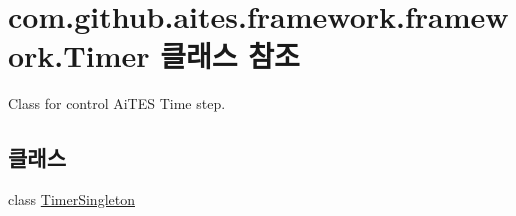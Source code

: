 \hypertarget{classcom_1_1github_1_1aites_1_1framework_1_1framework_1_1_timer}{}\section{com.\+github.\+aites.\+framework.\+framework.\+Timer 클래스 참조}
\label{classcom_1_1github_1_1aites_1_1framework_1_1framework_1_1_timer}


Class for control Ai\+T\+ES Time step.  


\subsection*{클래스}
\begin{DoxyCompactItemize}
\item 
class \mbox{\hyperlink{classcom_1_1github_1_1aites_1_1framework_1_1framework_1_1_timer_1_1_timer_singleton}{Timer\+Singleton}}
\end{DoxyCompactItemize}

